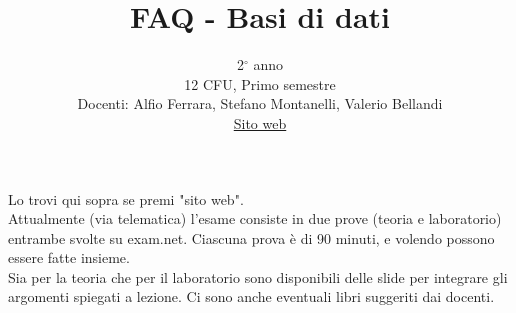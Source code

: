 \documentclass{article}
\title{FAQ - \textbf{Basi di dati}}
\author{
	2$^{\circ}$ anno\\12 CFU, Primo semestre\\
	Docenti: Alfio Ferrara, Stefano Montanelli, Valerio Bellandi\\ 
	\href{https://aferrarabd.ariel.ctu.unimi.it/v5/home/Default.aspx}{Sito web}
	\date{}
}
\begin{document}
 
	\maketitle
	
	\begin{enumerate}
		
		\rmfamily
		Lo trovi qui sopra se premi "sito web".\\
		
		Attualmente (via telematica) l'esame consiste in due prove (teoria e laboratorio) entrambe svolte
		su exam.net. Ciascuna prova è di 90 minuti, e volendo possono essere fatte insieme.\\
		
		Sia per la teoria che per il laboratorio sono disponibili delle slide per integrare gli argomenti
		spiegati a lezione. Ci sono anche eventuali libri suggeriti dai docenti.\\
		

		
	\end{enumerate}
	
\end{document}
